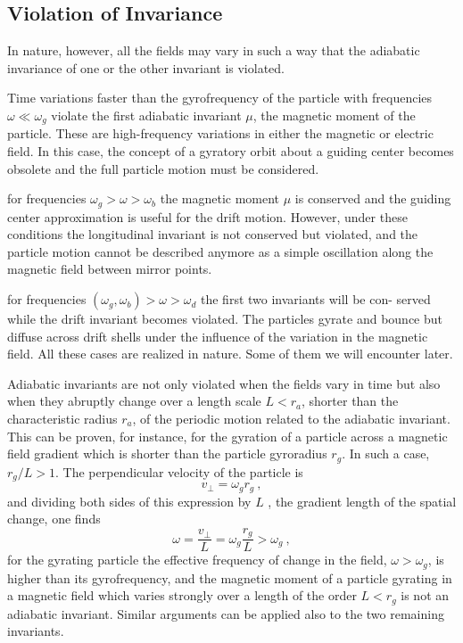 \documentclass[12pt,a4paper]{article}
\begin{document}
\subsection{Violation of Invariance}
\cite{1996bspp.book.....B} In nature, however, all the fields may vary in such a way that the adiabatic invariance of one or the other invariant is violated. 

Time variations faster than the gyrofrequency of the particle with frequencies $\omega \ll \omega_g$ violate the first adiabatic invariant $\mu$, the magnetic moment of the particle. These are high-frequency variations in either the magnetic or electric field. In this case, the concept of a gyratory orbit about a guiding center becomes obsolete and the full particle motion must be considered.

for frequencies $\omega_g > \omega > \omega_b$ the magnetic moment $\mu$ is conserved and the guiding center approximation is useful for the drift motion. However, under these conditions the longitudinal invariant is not conserved but violated, and the particle motion cannot be described anymore as a simple oscillation along the magnetic field between mirror points.

for frequencies $(\omega_g, \omega_b)  > \omega > \omega_d$ the first two invariants will be con- served while the drift invariant becomes violated. The particles gyrate and bounce but diffuse across drift shells under the influence of the variation in the magnetic field. All these cases are realized in nature. Some of them we will encounter later.

Adiabatic invariants are not only violated when the fields vary in time but also when they abruptly change over a length scale $L < r_a$, shorter than the characteristic radius $r_a$, of the periodic motion related to the adiabatic invariant. This can be proven, for instance, for the gyration of a particle across a magnetic field gradient which is shorter than the particle gyroradius $r_g$. In such a case, $r_g / L > 1$. The perpendicular velocity of the particle is
\begin{equation}
v_\perp = \omega_g r_g ~,
\end{equation}
and dividing both sides of this expression by $L$ , the gradient length of the spatial change, one finds
\begin{equation}
\omega = \dfrac{v_\perp}{L} = \omega_g \dfrac{r_g}{L} > \omega_g ~,
\end{equation}
for the gyrating particle the effective frequency of change in the field, $\omega > \omega_g$, is higher than its gyrofrequency, and the magnetic moment of a particle gyrating in a magnetic field which varies strongly over a length of the order $L < r_g$ is not an adiabatic invariant. Similar arguments can be applied also to the two remaining invariants.
\end{document}
